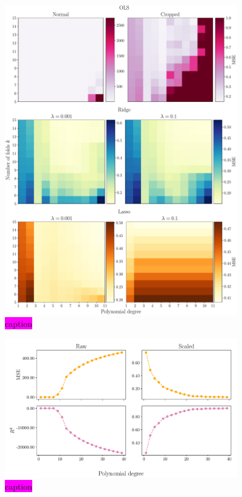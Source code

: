 \documentclass[aps,pra,english,notitlepage,reprint,nofootinbib]{revtex4-1}  %
\begin{document}
\begin{figure}
  \vspace*{-5pt}
  \centering %
  \includegraphics[width=0.9\textwidth]{../figs/f_OLS_Ridge_Lasso.pdf}
  \caption{\colorbox{magenta}{caption}}\label{fig:f OLS Ridge Lasso}
  \vspace*{-5pt}
\end{figure}

\begin{figure}
  \vspace*{-5pt}
  \centering %
  \includegraphics[width=0.9\textwidth]{../figs/g_error_scaled_vs_raw.pdf}
  \caption{\colorbox{magenta}{caption}}\label{fig:g error scaled vs raw}
  \vspace*{-5pt}
\end{figure}
\end{document}
